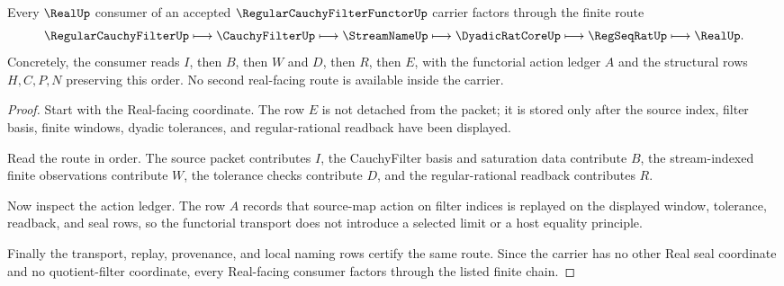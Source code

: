 \begin{theorem}
\label{thm:regular-cauchy-filter-functor-filter-to-stream-route}
Every $\RealUp$ consumer of an accepted $\RegularCauchyFilterFunctorUp$ carrier factors through the finite route
$$
\RegularCauchyFilterUp \longmapsto \CauchyFilterUp \longmapsto \StreamNameUp \longmapsto \DyadicRatCoreUp \longmapsto \RegSeqRatUp \longmapsto \RealUp .
$$
Concretely, the consumer reads $I$, then $B$, then $W$ and $D$, then $R$, then $E$, with the functorial action ledger $A$ and the structural rows $H,C,P,N$ preserving this order. No second real-facing route is available inside the carrier.
\end{theorem}
\begin{proof}
Start with the Real-facing coordinate. The row $E$ is not detached from the packet; it is stored only after the source index, filter basis, finite windows, dyadic tolerances, and regular-rational readback have been displayed.

Read the route in order. The source packet contributes $I$, the CauchyFilter basis and saturation data contribute $B$, the stream-indexed finite observations contribute $W$, the tolerance checks contribute $D$, and the regular-rational readback contributes $R$.

Now inspect the action ledger. The row $A$ records that source-map action on filter indices is replayed on the displayed window, tolerance, readback, and seal rows, so the functorial transport does not introduce a selected limit or a host equality principle.

Finally the transport, replay, provenance, and local naming rows certify the same route. Since the carrier has no other Real seal coordinate and no quotient-filter coordinate, every Real-facing consumer factors through the listed finite chain.
\end{proof}



